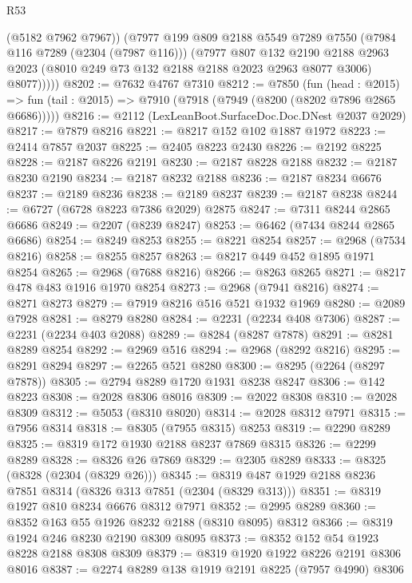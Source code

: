 \begin{lexlean}{R53}
\begin{coremodule}
            (@5182 @7962 @7967))
          (@7977
            @199
            @809
            @2188
            @5549
            @7289
            @7550
            (@7984 @116 @7289 (@2304 (@7987 @116)))
            (@7977
              @807
              @132
              @2190
              @2188
              @2963
              @2023
              (@8010 @249 @73 @132 @2188 @2188 @2023 @2963 @8077 @3006)
              @8077)))))
@8202 := @7632 @4767 @7310
@8212 := @7850
    (fun (head : @2015) =>
    fun (tail : @2015) => @7910 (@7918 (@7949 (@8200 (@8202 @7896 @2865 @6686)))))
@8216 := @2112 (LexLeanBoot.SurfaceDoc.Doc.DNest @2037 @2029)
@8217 := @7879 @8216
@8221 := @8217 @152 @102 @1887 @1972
@8223 := @2414 @7857 @2037
@8225 := @2405 @8223 @2430
@8226 := @2192 @8225
@8228 := @2187 @8226 @2191
@8230 := @2187 @8228 @2188
@8232 := @2187 @8230 @2190
@8234 := @2187 @8232 @2188
@8236 := @2187 @8234 @6676
@8237 := @2189 @8236
@8238 := @2189 @8237
@8239 := @2187 @8238
@8244 := @6727 (@6728 @8223 @7386 @2029) @2875
@8247 := @7311 @8244 @2865 @6686
@8249 := @2207 (@8239 @8247)
@8253 := @6462 (@7434 @8244 @2865 @6686)
@8254 := @8249 @8253
@8255 := @8221 @8254
@8257 := @2968 (@7534 @8216)
@8258 := @8255 @8257
@8263 := @8217 @449 @452 @1895 @1971 @8254
@8265 := @2968 (@7688 @8216)
@8266 := @8263 @8265
@8271 := @8217 @478 @483 @1916 @1970 @8254
@8273 := @2968 (@7941 @8216)
@8274 := @8271 @8273
@8279 := @7919 @8216 @516 @521 @1932 @1969
@8280 := @2089 @7928
@8281 := @8279 @8280
@8284 := @2231 (@2234 @408 @7306)
@8287 := @2231 (@2234 @403 @2088)
@8289 := @8284 (@8287 @7878)
@8291 := @8281 @8289 @8254
@8292 := @2969 @516
@8294 := @2968 (@8292 @8216)
@8295 := @8291 @8294
@8297 := @2265 @521 @8280
@8300 := @8295 (@2264 (@8297 @7878))
@8305 := @2794 @8289 @1720 @1931 @8238 @8247
@8306 := @142 @8223
@8308 := @2028 @8306 @8016
@8309 := @2022 @8308
@8310 := @2028 @8309
@8312 := @5053 (@8310 @8020)
@8314 := @2028 @8312 @7971
@8315 := @7956 @8314
@8318 := @8305 (@7955 @8315) @8253
@8319 := @2290 @8289
@8325 := @8319 @172 @1930 @2188 @8237 @7869 @8315
@8326 := @2299 @8289
@8328 := @8326 @26 @7869
@8329 := @2305 @8289
@8333 := @8325 (@8328 (@2304 (@8329 @26)))
@8345 := @8319 @487 @1929 @2188 @8236 @7851 @8314 (@8326 @313 @7851 (@2304 (@8329 @313)))
@8351 := @8319 @1927 @810 @8234 @6676 @8312 @7971
@8352 := @2995 @8289
@8360 := @8352 @163 @55 @1926 @8232 @2188 (@8310 @8095) @8312
@8366 := @8319 @1924 @246 @8230 @2190 @8309 @8095
@8373 := @8352 @152 @54 @1923 @8228 @2188 @8308 @8309
@8379 := @8319 @1920 @1922 @8226 @2191 @8306 @8016
@8387 := @2274 @8289 @138 @1919 @2191 @8225 (@7957 @4990) @8306

\end{coremodule}
\end{lexlean}
